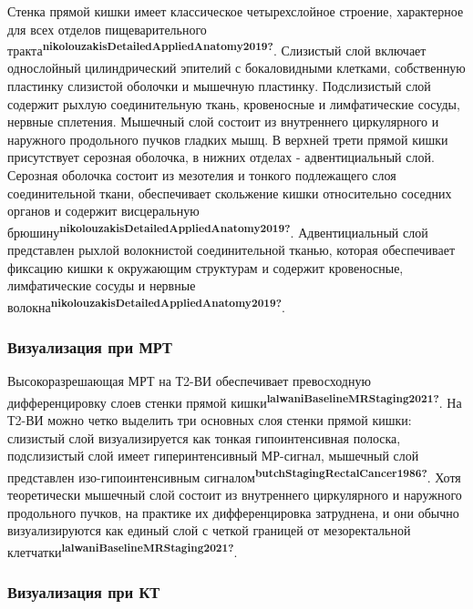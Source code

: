 \documentclass[
  russian,
  12pt,
  a4paper,
]{report}
\begin{document}
Стенка прямой кишки имеет классическое четырехслойное строение,
характерное для всех отделов пищеварительного
тракта\textsuperscript{\textbf{nikolouzakisDetailedAppliedAnatomy2019?}}.
Слизистый слой включает однослойный цилиндрический эпителий с
бокаловидными клетками, собственную пластинку слизистой оболочки и
мышечную пластинку. Подслизистый слой содержит рыхлую соединительную
ткань, кровеносные и лимфатические сосуды, нервные сплетения. Мышечный
слой состоит из внутреннего циркулярного и наружного продольного пучков
гладких мышц. В верхней трети прямой кишки присутствует серозная
оболочка, в нижних отделах - адвентициальный слой. Серозная оболочка
состоит из мезотелия и тонкого подлежащего слоя соединительной ткани,
обеспечивает скольжение кишки относительно соседних органов и содержит
висцеральную
брюшину\textsuperscript{\textbf{nikolouzakisDetailedAppliedAnatomy2019?}}.
Адвентициальный слой представлен рыхлой волокнистой соединительной
тканью, которая обеспечивает фиксацию кишки к окружающим структурам и
содержит кровеносные, лимфатические сосуды и нервные
волокна\textsuperscript{\textbf{nikolouzakisDetailedAppliedAnatomy2019?}}.

\subsubsection{Визуализация при
МРТ}\label{ux432ux438ux437ux443ux430ux43bux438ux437ux430ux446ux438ux44f-ux43fux440ux438-ux43cux440ux442}

Высокоразрешающая МРТ на Т2-ВИ обеспечивает превосходную дифференцировку
слоев стенки прямой
кишки\textsuperscript{\textbf{lalwaniBaselineMRStaging2021?}}. На Т2-ВИ
можно четко выделить три основных слоя стенки прямой кишки: слизистый
слой визуализируется как тонкая гипоинтенсивная полоска, подслизистый
слой имеет гиперинтенсивный МР-сигнал, мышечный слой представлен
изо-гипоинтенсивным
сигналом\textsuperscript{\textbf{butchStagingRectalCancer1986?}}. Хотя
теоретически мышечный слой состоит из внутреннего циркулярного и
наружного продольного пучков, на практике их дифференцировка затруднена,
и они обычно визуализируются как единый слой с четкой границей от
мезоректальной
клетчатки\textsuperscript{\textbf{lalwaniBaselineMRStaging2021?}}.

\subsubsection{Визуализация при
КТ}\label{ux432ux438ux437ux443ux430ux43bux438ux437ux430ux446ux438ux44f-ux43fux440ux438-ux43aux442}
\end{document}
